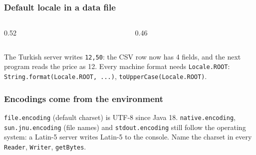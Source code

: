 \documentclass[aspectratio=169,10pt,compress]{beamer}
\begin{document}
\begin{frame}[t,fragile] \frametitle{Default locale in a data file}
  \begin{columns}[T]
    \begin{column}{0.52\textwidth}
    \end{column}
    \begin{column}{0.46\textwidth}
    \end{column}
  \end{columns}

  \vspace{0.1em}
  \small The Turkish server writes \texttt{12,50}: the CSV row now has 4 fields, and the next program reads the price as 12.
  Every machine format needs \texttt{Locale.ROOT}: \texttt{String.format(Locale.ROOT, ...)}, \texttt{toUpperCase(Locale.ROOT)}.
\end{frame}




\begin{frame}[t,fragile] \frametitle{Encodings come from the environment}

  \vspace{0.1em}
  \small
  \texttt{file.encoding} (default charset) is UTF-8 since Java 18. \texttt{native.encoding}, \texttt{sun.jnu.encoding}
  (file names) and \texttt{stdout.encoding} still follow the operating system: a Latin-5 server writes Latin-5 to the
  console. Name the charset in every \texttt{Reader}, \texttt{Writer}, \texttt{getBytes}.
\end{frame}

\end{document}
